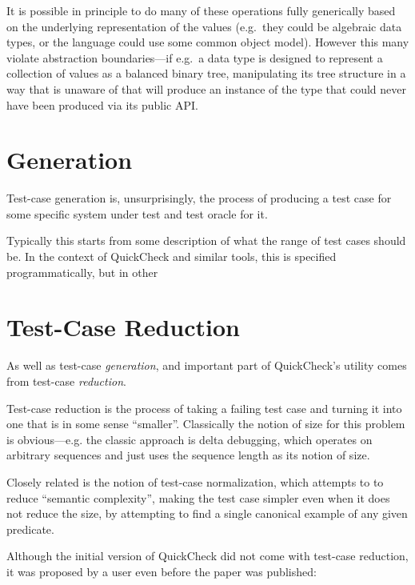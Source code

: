 It is possible in principle to do many of these operations fully generically based on the underlying representation of the values (e.g.~they could be algebraic data types,
or the language could use some common object model).
However this many violate abstraction boundaries---if
e.g.\ a data type is designed to represent a collection of values as a balanced binary tree,
manipulating its tree structure in a way that is unaware of that will produce an instance of the type that could never have been produced via its public API.\ 

\section{Generation}

Test-case generation is,
unsurprisingly,
the process of producing a test case for some specific system under test and test oracle for it.

Typically this starts from some description of what the range of test cases should be.
In the context of QuickCheck and similar tools,
this is specified programmatically,
but in other

\section{Test-Case Reduction}\label{sec:shrinking}

As well as test-case \emph{generation},
and important part of QuickCheck's utility comes from test-case \emph{reduction}.

Test-case reduction is the process of taking a failing test case and turning it into one that is in some sense ``smaller''.
Classically the notion of size for this problem is obvious---e.g.
the classic approach is delta debugging\cite{DBLP:journals/tse/ZellerH02},
which operates on arbitrary sequences and just uses the sequence length as its notion of size.

Closely related is the notion of test-case normalization\cite{DBLP:conf/issta/GroceHK17},
which attempts to to reduce ``semantic complexity'',
making the test case simpler even when it does not reduce the size,
by attempting to find a single canonical example of any given predicate.

Although the initial version of QuickCheck did not come with test-case reduction,
it was proposed by a user even before the paper was published:

